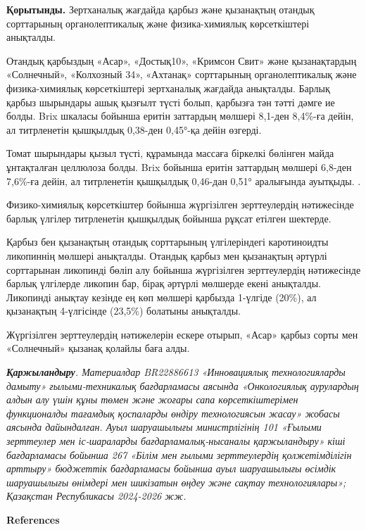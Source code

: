 \begin{multicols}{2}
{\bfseries Қорытынды.} Зертханалық жағдайда қарбыз және қызанақтың отандық
сорттарының органолептикалық және физика-химиялық көрсеткіштері
анықталды.

Отандық қарбыздың «Асар», «Достық10», «Кримсон Свит» және қызанақтардың
«Солнечный», «Колхозный 34», «Ахтанақ» сорттарының органолептикалық және
физика-химиялық көрсеткіштері зертханалық жағдайда анықталды. Барлық
қарбыз шырындары ашық қызғылт түсті болып, қарбызға тән тәтті дәмге ие
болды. Brix шкаласы бойынша еритін заттардың мөлшері 8,1-ден 8,4\%-ға
дейін, ал титрленетін қышқылдық 0,38-ден 0,45°-қа дейін өзгерді.

Томат шырындары қызыл түсті, құрамында массаға біркелкі бөлінген майда
ұнтақталған целлюлоза болды. Brix бойынша еритін заттардың мөлшері
6,8-ден 7,6\%-ға дейін, ал титрленетін қышқылдық 0,46-дан 0,51°
аралығында ауытқыды. .

Физико-химиялық көрсеткіштер бойынша жүргізілген зерттеулердің
нәтижесінде барлық үлгілер титрленетін қышқылдық бойынша рұқсат етілген
шектерде.

Қарбыз бен қызанақтың отандық сорттарының үлгілеріндегі каротиноидты
ликопиннің мөлшері анықталды. Отандық қарбыз мен қызанақтың әртүрлі
сорттарынан ликопинді бөліп алу бойынша жүргізілген зерттеулердің
нәтижесінде барлық үлгілерде ликопин бар, бірақ әртүрлі мөлшерде екені
анықталды. Ликопинді анықтау кезінде ең көп мөлшері қарбызда 1-үлгіде
(20\%), ал қызанақтың 4-үлгісінде (23,5\%) болатыны анықталды.

Жүргізілген зерттеулердің нәтижелерін ескере отырып, «Асар» қарбыз сорты
мен «Солнечный» қызанақ қолайлы баға алды.

\emph{{\bfseries Қаржыландыру}. Материалдар BR22886613 «Инновациялық
технологияларды дамыту» ғылыми-техникалық бағдарламасы аясында
«Онкологиялық аурулардың алдын алу үшін құны төмен және жоғары сапа
көрсеткіштерімен функционалды тағамдық қоспаларды өндіру технологиясын
жасау» жобасы аясында дайындалған. Ауыл шаруашылығы министрлігінің 101
«Ғылыми зерттеулер мен іс-шараларды бағдарламалық-нысаналы қаржыландыру»
кіші бағдарламасы бойынша 267 «Білім мен ғылыми зерттеулердің
қолжетімділігін арттыру» бюджеттік бағдарламасы бойынша ауыл шаруашылығы
өсімдік шаруашылығы өнімдері мен шикізатын өңдеу және сақтау
технологиялары»; Қазақстан Республикасы 2024-2026 жж.}
\end{multicols}

\begin{center}
{\bfseries References}
\end{center}

